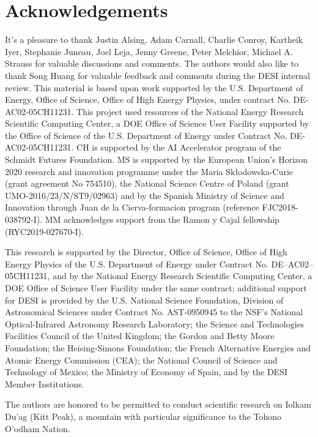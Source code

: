 \documentclass[12pt, letterpaper, preprint]{aastex63}
\begin{document}
\section*{Acknowledgements}
It's a pleasure to thank
    Justin Alsing, 
    Adam Carnall, 
    Charlie Conroy, 
    Kartheik Iyer, 
    Stephanie Juneau, 
    Joel Leja, 
    Jenny Greene, 
    Peter Melchior,
    Michael A. Strauss
for valuable discussions and comments. 
The authors would also like to thank Song Huang for valuable feedback and
comments during the DESI internal review. 
This material is based upon work supported by the U.S. Department of Energy,
Office of Science, Office of High Energy Physics, under contract No.
DE-AC02-05CH11231.  This project used resources of the National Energy Research
Scientific Computing Center, a DOE Office of Science User Facility supported by
the Office of Science of the U.S.  Department of Energy under Contract No.
DE-AC02-05CH11231. 
CH is supported by the AI Accelerator program of the Schmidt Futures Foundation.
MS is supported by the European Union's  Horizon 2020 research and innovation
programme under the Maria Sk\l{}odowska-Curie (grant agreement No 754510), the
National Science Centre of Poland (grant UMO-2016/23/N/ST9/02963) and by the
Spanish Ministry of Science and Innovation through Juan de la Cierva-formacion
program (reference FJC2018-038792-I).
MM acknowledges support from the Ramon y Cajal fellowship (RYC2019-027670-I).

This research is supported by the Director, Office of Science, Office of High
Energy Physics of the U.S. Department of Energy under Contract No.
DE–AC02–05CH11231, and by the National Energy Research Scientific Computing
Center, a DOE Office of Science User Facility under the same contract;
additional support for DESI is provided by the U.S. National Science
Foundation, Division of Astronomical Sciences under Contract No. AST-0950945 to
the NSF’s National Optical-Infrared Astronomy Research Laboratory; the Science
and Technologies Facilities Council of the United Kingdom; the Gordon and Betty
Moore Foundation; the Heising-Simons Foundation; the French Alternative
Energies and Atomic Energy Commission (CEA); the National Council of Science
and Technology of Mexico; the Ministry of Economy of Spain, and by the DESI
Member Institutions.

The authors are honored to be permitted to conduct scientific research on
Iolkam Du’ag (Kitt Peak), a mountain with particular significance to the Tohono
O’odham Nation.


\appendix





 
\end{document}
